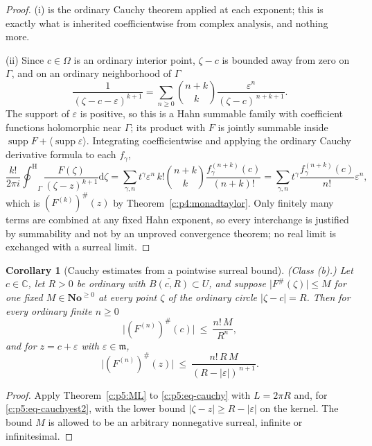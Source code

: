 \documentclass[11pt,a4paper]{article}
\numberwithin{equation}{section}
\newtheorem{corollary}[theorem]{Corollary}
\theoremstyle{definition}
\theoremstyle{remark}
\theoremstyle{plain}
\newcommand{\No}{\mathbf{No}}
\newcommand{\CC}{\mathbb C}
\newcommand{\mm}{\mathfrak m}
\DeclareMathOperator{\supp}{supp}
\newcommand{\tm}{t}
\newcommand{\ev}[1]{#1^{\#}}
\newcommand{\Neu}[1]{\langle #1\rangle}
\newcommand{\ointH}{{\oint^{\mathrm H}}}
\newcommand{\abs}[1]{\lvert #1\rvert}
\newcommand{\dd}{\mathrm d}
\begin{document}
\begin{proof}
(i) is the ordinary Cauchy theorem applied at each exponent; this is
exactly what is inherited coefficientwise from complex analysis, and
nothing more.

(ii) Since $c\in\Omega$ is an ordinary interior point, $\zeta-c$ is
bounded away from zero on $\Gamma$, and on an ordinary neighborhood of
$\Gamma$
\[
 \frac1{(\zeta-c-\varepsilon)^{k+1}}
 =\sum_{n\ge0}\binom{n+k}{k}
   \frac{\varepsilon^{n}}{(\zeta-c)^{\,n+k+1}} .
\]
The support of $\varepsilon$ is positive, so this is a Hahn summable
family with coefficient functions holomorphic near $\Gamma$; its product
with $F$ is jointly summable inside
$\supp F+\Neu{\supp\varepsilon}$. Integrating coefficientwise and
applying the ordinary Cauchy derivative formula to each $f_\gamma$,
\[
 \frac{k!}{2\pi i}\ointH_{\Gamma}\frac{F(\zeta)}{(\zeta-z)^{k+1}}
   \dd\zeta
 =\sum_{\gamma,n}\tm^{\gamma}\varepsilon^{n}\,
    k!\binom{n+k}{k}\frac{f_\gamma^{(n+k)}(c)}{(n+k)!}
 =\sum_{\gamma,n}\tm^{\gamma}
    \frac{f_\gamma^{(n+k)}(c)}{n!}\varepsilon^{n},
\]
which is $\ev{(F^{(k)})}(z)$ by Theorem~\ref{c:p4:monadtaylor}. Only
finitely many terms are combined at any fixed Hahn exponent, so every
interchange is justified by summability and not by an unproved
convergence theorem; no real limit is exchanged with a surreal limit.
\end{proof}

\begin{corollary}[Cauchy estimates from a pointwise surreal bound]
\label{c:p5:cauchyest}
\emph{(Class (b).)} Let $c\in\CC$, let $R>0$ be ordinary with
$\overline{B(c,R)}\subset U$, and suppose $\abs{\ev F(\zeta)}\le M$ for
one fixed $M\in\No^{\ge0}$ at every point $\zeta$ of the \emph{ordinary}
circle $\abs{\zeta-c}=R$. Then for every ordinary finite $n\ge0$
\begin{equation}\label{c:p5:eq-cauchyest}
 \bigl|\ev{(F^{(n)})}(c)\bigr|\ \le\ \frac{n!\,M}{R^{n}},
\end{equation}
and for $z=c+\varepsilon$ with $\varepsilon\in\mm$,
\begin{equation}\label{c:p5:eq-cauchyest2}
 \bigl|\ev{(F^{(n)})}(z)\bigr|
 \ \le\ \frac{n!\,R\,M}{(R-\abs\varepsilon)^{\,n+1}} .
\end{equation}
\end{corollary}

\begin{proof}
Apply Theorem~\ref{c:p5:ML} to \eqref{c:p5:eq-cauchy} with $L=2\pi R$
and, for \eqref{c:p5:eq-cauchyest2}, with the lower bound
$\abs{\zeta-z}\ge R-\abs\varepsilon$ on the kernel. The bound $M$ is
allowed to be an arbitrary nonnegative surreal, infinite or
infinitesimal.
\end{proof}
\end{document}

